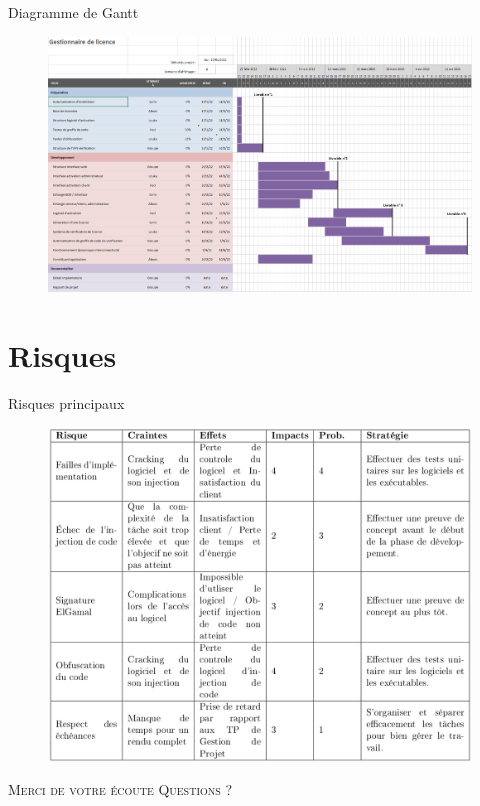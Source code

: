 \documentclass{cubeamer}
\begin{document}
\begin{frame}{Diagramme de Gantt}
    \begin{figure}
        \centering
        \includegraphics[scale=0.22]{img/Gantt.png}
    \end{figure}
\end{frame}

\section{Risques}

\begin{frame}{Risques principaux}
    \begin{figure}
        \centering
        \vspace{-2mm}
        \includegraphics[scale=0.22]{img/risques.png}
    \end{figure}
\end{frame}

\begin{frame}[standout]
    \Huge\textsc{Merci de votre écoute}
    \vfill
    \LARGE\textsc{Questions ?}
\end{frame}
\end{document}
